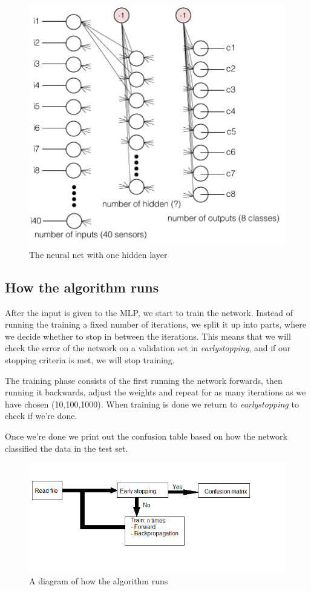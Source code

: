 \begin{figure}
    \centering
    \includegraphics[scale=0.5]{figures/neuralnet.png}
    \caption{The neural net with one hidden layer}
    \label{fig:awesome_image}
\end{figure}

\subsection*{How the algorithm runs}
After the input is given to the MLP, we start to train the network.
Instead of running the training a fixed number of iterations, we split it up into parts, where we decide whether to stop in between the iterations.
This means that we will check the error of the network on a validation set in \emph{earlystopping}, and if our stopping criteria is met, we will stop training.

The training phase consists of the first running the network forwards, then running it backwards, adjust the weights and repeat for as many iterations as we have chosen (10,100,1000). When training is done we return to \emph{earlystopping} to check if we're done.

Once we're done we print out the confusion table based on how the network classified the data in the test set.

\begin{figure}[h]
    \centering
    \includegraphics[scale=0.5]{figures/diagram.png}
    \caption{A diagram of how the algorithm runs}
    \label{fig:awesome_image}
\end{figure}

